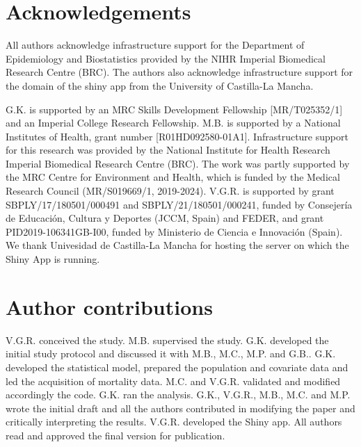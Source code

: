 \section*{Acknowledgements}
		
All authors acknowledge infrastructure support for the Department of Epidemiology and Biostatistics provided by the NIHR Imperial Biomedical Research Centre (BRC). The authors also acknowledge infrastructure support for the domain of the shiny app from the University of Castilla-La Mancha.
		
G.K. is supported by an MRC Skills Development Fellowship [MR/T025352/1] and an Imperial College Research Fellowship. M.B. is supported by a National Institutes of Health, grant number [R01HD092580-01A1]. Infrastructure support for this research was provided by the National Institute for Health Research Imperial Biomedical Research Centre (BRC). The work was partly supported by the MRC Centre for Environment and Health, which is funded by the Medical Research Council (MR/S019669/1, 2019-2024). V.G.R. is supported by grant SBPLY/17/180501/000491 and SBPLY/21/180501/000241, funded by Consejer\'ia de Educaci\'on, Cultura y Deportes (JCCM, Spain) and FEDER, and grant PID2019-106341GB-I00, funded by Ministerio de Ciencia e Innovaci\'on (Spain). We thank Univesidad de Castilla-La Mancha for hosting the server on which the Shiny App is running.
		
		
\section*{Author contributions}
		
V.G.R. conceived the study. M.B. supervised the study. G.K. developed the initial study protocol and discussed it with M.B., M.C., M.P. and G.B.. G.K. developed the statistical model, prepared the population and covariate data and led the acquisition of mortality data. M.C. and V.G.R. validated and modified accordingly the code. G.K. ran the analysis. G.K., V.G.R., M.B., M.C. and M.P. wrote the initial draft and all the authors contributed in modifying the paper and critically interpreting the results. V.G.R. developed the Shiny app. All authors read and approved the final version for publication.
		
		
		
